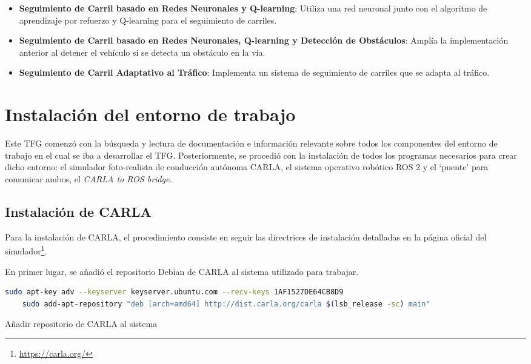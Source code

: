 \bigskip

\begin{itemize}
  \item \textbf{Seguimiento de Carril basado en Redes Neuronales y Q-learning}: Utiliza una red neuronal junto con el algoritmo de aprendizaje por refuerzo y Q-learning para el seguimiento de carriles.

  \item \textbf{Seguimiento de Carril basado en Redes Neuronales, Q-learning y Detección de Obstáculos}: Amplía la implementación anterior al detener el vehículo si se detecta un obstáculo en la vía.

  \item \textbf{Seguimiento de Carril Adaptativo al Tráfico}: Implementa un sistema de seguimiento de carriles que se adapta al tráfico.
\end{itemize}

\bigskip


\section{Instalación del entorno de trabajo}
\label{Instalación del entorno de trabajo}

Este \ac{TFG} comenzó con la búsqueda y lectura de documentación e información relevante sobre todos los componentes del entorno de trabajo en el cual se iba a desarrollar el \ac{TFG}. Posteriormente, se procedió con la instalación de todos los programas necesarios para crear dicho entorno: el simulador foto-realista de conducción autónoma CARLA, el sistema operativo robótico ROS 2 y el `puente' para comunicar ambos, el \textit{CARLA to ROS bridge.}

\subsection{Instalación de CARLA}
\label{Instalación de CARLA}

Para la instalación de CARLA, el procedimiento consiste en seguir las directrices de instalación detalladas en la página oficial del simulador\footnote{\url{https://carla.org/}}.

\bigskip

En primer lugar, se añadió el repositorio Debian de CARLA al sistema utilizado para trabajar.
 
   \begin{code}[H]
	\begin{lstlisting}[language=sh]
    sudo apt-key adv --keyserver keyserver.ubuntu.com --recv-keys 1AF1527DE64CB8D9
    sudo add-apt-repository "deb [arch=amd64] http://dist.carla.org/carla $(lsb_release -sc) main"
	\end{lstlisting}
\caption[Añadir repositorio de CARLA al sistema]{Añadir repositorio de CARLA al sistema}
\label{cod:Añadir repositorio de CARLA al sistema}
\end{code}

